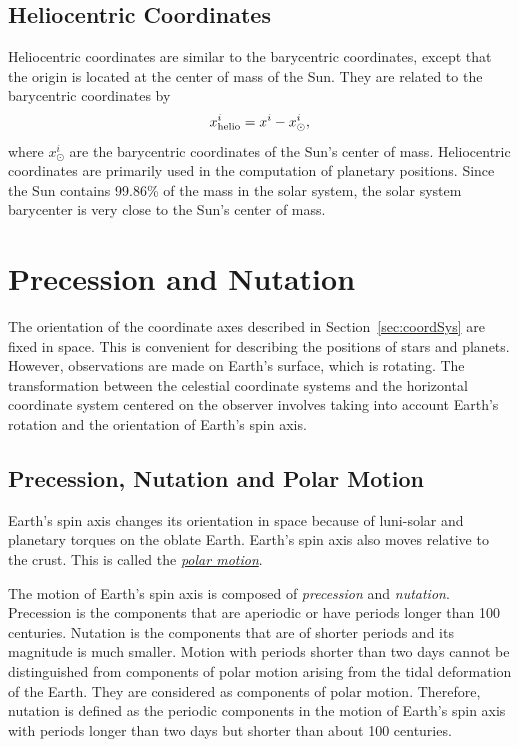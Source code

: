 \documentclass[12pt]{article}
\newcommand \beq {\begin{equation}}
\newcommand \eeq {\end{equation}}
\begin{document}
\subsection{Heliocentric Coordinates} 

Heliocentric coordinates are similar to the barycentric coordinates, 
except that the origin is located at the center of mass of the Sun. 
They are related to the barycentric coordinates by 
\beq
 x^i_{\rm helio} = x^i - x^i_{\odot} ,
\eeq
where $x^i_{\odot}$ are the barycentric coordinates of the Sun's center 
of mass. Heliocentric coordinates are primarily used in the computation 
of planetary positions. Since the Sun contains 99.86\% of the mass 
in the solar system, the solar system barycenter is very close to the 
Sun's center of mass.

\section{Precession and Nutation}
\label{sec:precessionNutation}

The orientation of the coordinate axes described in Section~\ref{sec:coordSys} 
are fixed in space. This is convenient for describing the positions of 
stars and planets. However, observations are made on Earth's surface, which 
is rotating. The transformation between the celestial coordinate systems and 
the horizontal coordinate system centered on the observer involves taking into 
account Earth's rotation and the orientation of Earth's spin axis. 

\subsection{Precession, Nutation and Polar Motion}

Earth's spin axis changes its orientation in space because of 
luni-solar and planetary torques on the oblate Earth. 
Earth's spin axis also moves relative to the crust. This is called the 
\href{https://en.wikipedia.org/wiki/Polar_motion}{\it polar motion}. 

The motion of Earth's spin axis is composed of {\em precession} and {\em nutation}. 
Precession is the components that are aperiodic or have periods longer 
than 100 centuries. Nutation is the components that are of shorter periods 
and its magnitude is much smaller. Motion with periods shorter than two days 
cannot be distinguished from components of polar motion arising from the tidal 
deformation of the Earth. They are considered as components of polar motion. 
Therefore, nutation is defined as the periodic components in the motion of 
Earth's spin axis with periods longer than two days but shorter than about 100 centuries. 
\end{document}
